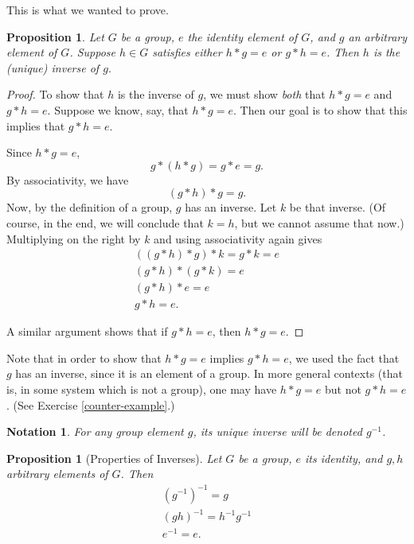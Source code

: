 \documentclass{amsbook}
\theoremstyle{plain}
\newtheorem{notation}[theorem]{Notation}
\newtheorem{proposition}[theorem]{Proposition}
\numberwithin{equation}{chapter}
\numberwithin{theorem}{chapter}
\begin{document}
This is what we wanted to prove.

\begin{proposition}
\label{one-sided}Let $G$ be a group, $e$ the identity element of $G$, and $g$
an arbitrary element of $G$. Suppose $h\in G$ satisfies \textit{either} $h\ast
g=e$ or $g\ast h=e$. Then $h$ is the (unique) inverse of $g$.
\end{proposition}

\begin{proof}
To show that $h$ is the inverse of $g$, we must show \textit{both} that $h\ast
g=e$ and $g\ast h=e$. Suppose we know, say, that $h\ast g=e$. Then our goal is
to show that this implies that $g\ast h=e$.

Since $h\ast g=e$,
\[
g\ast(h\ast g)=g\ast e=g\text{.}%
\]
By associativity, we have
\[
(g\ast h)\ast g=g\text{.}%
\]
Now, by the definition of a group, $g$ has an inverse. Let $k$ be that
inverse. (Of course, in the end, we will conclude that $k=h$, but we cannot
assume that now.) Multiplying on the right by $k$ and using associativity
again gives
\begin{align*}
((g\ast h)\ast g)\ast k=g\ast k=e\\
(g\ast h)\ast(g\ast k)=e\\
(g\ast h)\ast e=e\\
g\ast h=e\text{.}%
\end{align*}

A similar argument shows that if $g\ast h=e$, then $h\ast g=e$.
\end{proof}

Note that in order to show that $h\ast g=e$ implies $g\ast h=e$, we used the
fact that $g$ has an inverse, since it is an element of a group. In more
general contexts (that is, in some system which is not a group), one may have
$h\ast g=e$ but not $g\ast h=e$. (See Exercise \ref{counter-example}.)

\begin{notation}
For any group element $g$, its unique inverse will be denoted $g^{-1}$.
\end{notation}

\begin{proposition}
[Properties of Inverses]\label{inverse.properties}Let $G$ be a group, $e$ its
identity, and $g,h$ arbitrary elements of $G$. Then
\begin{align*}
\left(  g^{-1}\right)  ^{-1}=g\\
\left(  gh\right)  ^{-1}=h^{-1}g^{-1}\\
e^{-1}=e\text{.}%
\end{align*}
\end{proposition}
\end{document}
